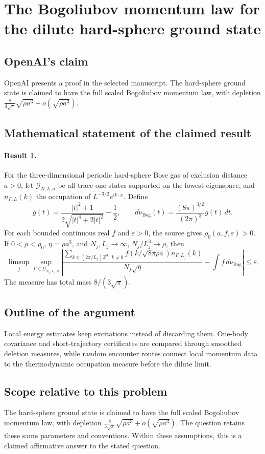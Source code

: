 \documentclass[11pt]{article}
\begin{document}
\section*{The Bogoliubov momentum law for the dilute hard-sphere ground state}

\subsection{OpenAI's claim}
OpenAI presents a proof in the selected manuscript. The hard-sphere ground state is claimed to have the full scaled Bogoliubov momentum law, with depletion $\frac{8}{3\sqrt\pi}\sqrt{\rho a^3}+o(\sqrt{\rho a^3})$.

\subsection{Mathematical statement of the claimed result}
\paragraph{Result 1.} For the three-dimensional periodic hard-sphere Bose gas of exclusion distance \(a>0\), let \(\mathcal G_{N,L,a}\) be all trace-one states supported on the lowest eigenspace, and \(n_{\Gamma,L}(k)\) the occupation of \(L^{-3/2}e^{ik\cdot x}\). Define
\[
 g(t)=\frac{|t|^2+1}{2\sqrt{|t|^4+2|t|^2}}-\frac12,\qquad
 d\nu_{\mathrm{Bog}}(t)=\frac{(8\pi)^{3/2}}{(2\pi)^3}g(t)\,dt.
\]
For each bounded continuous real \(f\) and \(\varepsilon>0\), the source gives \(\rho_0(a,f,\varepsilon)>0\). If \(0<\rho<\rho_0\), \(\eta=\rho a^3\), and \(N_j,L_j\to\infty\), \(N_j/L_j^3\to\rho\), then
\[
 \limsup_j\sup_{\Gamma\in\mathcal G_{N_j,L_j,a}}
 \left|\frac{\sum_{k\in(2\pi/L_j)\mathbb Z^3,\ k\ne0}
 f(k/\sqrt{8\pi\rho a})n_{\Gamma,L_j}(k)}{N_j\sqrt\eta}
 -\int f\,d\nu_{\mathrm{Bog}}\right|\le\varepsilon.
\]
The measure has total mass \(8/(3\sqrt\pi)\).

\subsection{Outline of the argument}
Local energy estimates keep excitations instead of discarding them. One-body covariance and short-trajectory certificates are compared through smoothed deletion measures, while random encounter routes connect local momentum data to the thermodynamic occupation measure before the dilute limit.

\subsection{Scope relative to this problem}
The hard-sphere ground state is claimed to have the full scaled Bogoliubov momentum law, with depletion $\frac{8}{3\sqrt\pi}\sqrt{\rho a^3}+o(\sqrt{\rho a^3})$. The question retains these same parameters and conventions. Within these assumptions, this is a claimed affirmative answer to the stated question.
\end{document}
